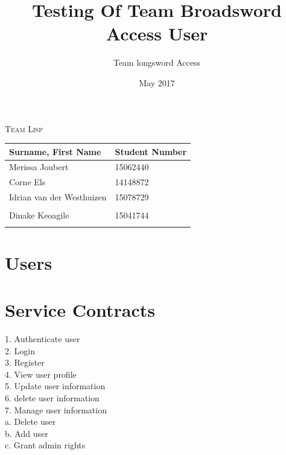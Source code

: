 \documentclass[english]{article}
\begin{document}
\title{Testing Of Team Broadsword Access User }
\author{Team longsword Access }
\date{May 2017}
\maketitle
\begin{center}
{\scshape\Large Team Lisp \par}
\vspace{0.9cm}
	\begin{tabu} to \textwidth { X[l] X[l]}
		\hline
		\textbf{Surname, First Name  }	& \textbf{Student Number}	\\ \hline \hline
		   Merissa Joubert &15062440	\\ \hline
		  Corne Els &14148872	\\ \hline
		Idrian van der Westhuizen&15078729\\ \hline
		 &	\\ \hline
		 Dinake Keoagile&15041744\\ \hline
		 &	\\ \hline
		\hline
	\end{tabu}

	\end{center}

	\newpage
	\tableofcontents

	\newpage

\section{Users}

\section{Service Contracts}
1.	Authenticate user\\
2.	Login\\
3.	Register\\
4.	View user profile\\
5.	Update user information\\
6.	delete user information\\
7.	Manage user information\\
    a.	Delete user\\
    b.	Add user\\
    c.	Grant admin rights\\
\end{document}
